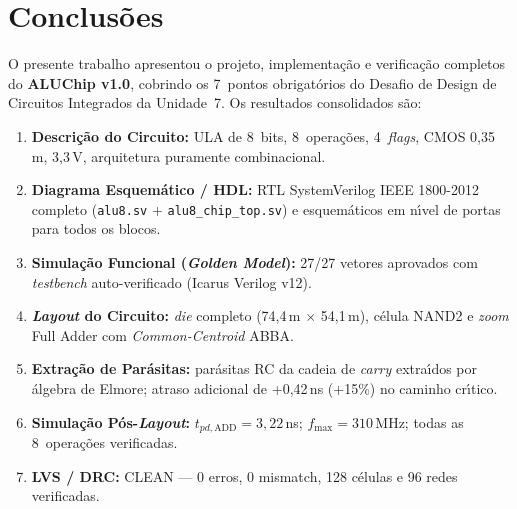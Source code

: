 \documentclass[12pt,a4paper]{article}
\begin{document}
\section{Conclus\~{o}es}

O presente trabalho apresentou o projeto, implementa\c{c}\~{a}o e verifica\c{c}\~{a}o completos do \textbf{ALUChip v1.0}, cobrindo os 7~pontos obrigat\'{o}rios do Desafio de Design de Circuitos Integrados da Unidade~7. Os resultados consolidados s\~{a}o:

\begin{enumerate}[leftmargin=2em,label=\textbf{\arabic*.}]
  \item \textbf{Descri\c{c}\~{a}o do Circuito:} ULA de 8~bits, 8~opera\c{c}\~{o}es, 4~\textit{flags}, CMOS 0,35\,\textmu m, 3,3\,V, arquitetura puramente combinacional.
  \item \textbf{Diagrama Esquem\'{a}tico / HDL:} RTL SystemVerilog IEEE 1800-2012 completo (\texttt{alu8.sv} + \texttt{alu8\_chip\_top.sv}) e esquem\'{a}ticos em n\'{\i}vel de portas para todos os blocos.
  \item \textbf{Simula\c{c}\~{a}o Funcional (\textit{Golden Model}):} 27/27 vetores aprovados com \textit{testbench} auto-verificado (Icarus Verilog v12).
  \item \textbf{\textit{Layout} do Circuito:} \textit{die} completo (74,4\,\textmu m $\times$ 54,1\,\textmu m), c\'{e}lula NAND2 e \textit{zoom} Full Adder com \textit{Common-Centroid} ABBA.
  \item \textbf{Extra\c{c}\~{a}o de Par\'{a}sitas:} par\'{a}sitas RC da cadeia de \textit{carry} extra\'{\i}dos por \'{a}lgebra de Elmore; atraso adicional de +0,42\,ns (+15\%) no caminho cr\'{\i}tico.
  \item \textbf{Simula\c{c}\~{a}o P\'{o}s-\textit{Layout}:} $t_{pd,\text{ADD}} = 3{,}22$\,ns; $f_{\max} = 310$\,MHz; todas as 8~opera\c{c}\~{o}es verificadas.
  \item \textbf{LVS / DRC:} CLEAN --- 0 erros, 0 mismatch, 128 c\'{e}lulas e 96 redes verificadas.
\end{enumerate}
\end{document}
